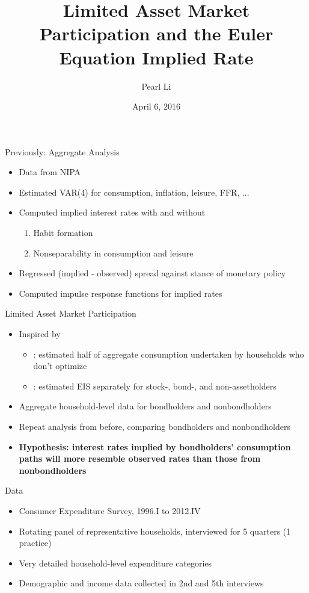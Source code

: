 \documentclass{beamer}
\title[Euler Equation]{\textbf{Limited Asset Market Participation} and the Euler Equation Implied Rate}
\author[Li]{Pearl Li}
\date{April 6, 2016}
\begin{document}
\begin{frame}
\titlepage
\end{frame}

\begin{frame}{Previously: Aggregate Analysis}
\begin{itemize}
\item Data from NIPA
\item Estimated VAR(4) for consumption, inflation, leisure, FFR, ...
\item Computed implied interest rates with and without
  \begin{enumerate}
  \item Habit formation
  \item Nonseparability in consumption and leisure
  \end{enumerate}
\item Regressed (implied - observed) spread against stance of monetary policy
\item Computed impulse response functions for implied rates
\end{itemize}
\end{frame}

\begin{frame}{Limited Asset Market Participation}
\begin{itemize}
\item Inspired by
  \begin{itemize}
  \item \cite{campbell89}: estimated half of aggregate consumption undertaken by households who don't optimize
  \item \cite{vissing02}: estimated EIS separately for stock-, bond-, and non-assetholders
  \end{itemize}
\item Aggregate household-level data for bondholders and nonbondholders
\item Repeat analysis from before, comparing bondholders and nonbondholders
\item \textbf{Hypothesis: interest rates implied by bondholders' consumption paths will more resemble observed rates than those from nonbondholders}
\end{itemize}
\end{frame}

\begin{frame}{Data}
\begin{itemize}
\item Consumer Expenditure Survey, 1996.I to 2012.IV
\item Rotating panel of representative households, interviewed for 5 quarters (1 practice)
\item Very detailed household-level expenditure categories
\item Demographic and income data collected in 2nd and 5th interviews
\end{itemize}
\end{frame}
\end{document}
